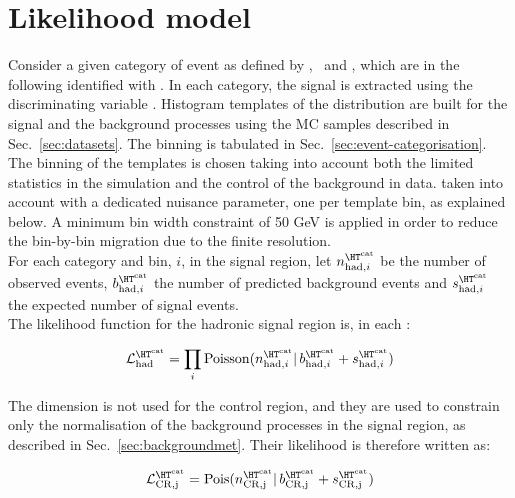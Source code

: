 \section{Likelihood model}
\label{sec:likelihood}

Consider a given category of event as defined by \njet, \nb~and \scalht, which are in the following identified with \htcat. 
In each category, the signal is extracted using the discriminating variable \mht. 
Histogram templates of the \mht distribution are built for the signal and the background processes 
using the MC samples described in Sec.~\ref{sec:datasets}. 
The \mht binning is tabulated in Sec.~\ref{sec:event-categorisation}.\\
The binning of the templates is chosen taking into account both the limited statistics in the simulation and 
the control of the background in data. 
taken into account with a dedicated nuisance parameter, one per template bin, as explained below. 
A minimum bin width constraint of 50 GeV is applied
in order to reduce the bin-by-bin migration due to the finite \mht resolution.\\

For each category \htcat and \mht bin, $i$, in the signal region, let $n^{\htcat}_{\mathrm{had},i}$ be the number of observed events, 
$b^{\htcat}_{\mathrm{had},i}$ the number of predicted background events and $s^{\htcat}_{\mathrm{had},i}$ the expected number of signal events. \\
The likelihood function for the hadronic signal region is, in each \htcat:

\begin{equation}
\mathcal{L}^{\htcat}_{\mathrm{had}}=\prod_i \mathrm{Poisson}(n^{\htcat}_{\mathrm{had},i} |\, b^{\htcat}_{\mathrm{had},i} + s^{\htcat}_{\mathrm{had},i})
\label{eq:hadronicLikelihood}
\end{equation}

The \mht dimension is not used for the control region, and they are used to constrain only the normalisation of the background processes 
in the signal region, as described in Sec.~\ref{sec:backgroundmet}. 
Their likelihood is therefore written as:

\begin{equation}
\mathcal{L}^{\htcat}_{\mathrm{CR,j}}=\mathrm{Pois}(n^{\htcat}_{\mathrm{CR,j}} |\, b^{\htcat}_{\mathrm{CR,j}} + s^{\htcat}_{\mathrm{CR,j}})
\label{eq:controlLikelihood}
\end{equation}

